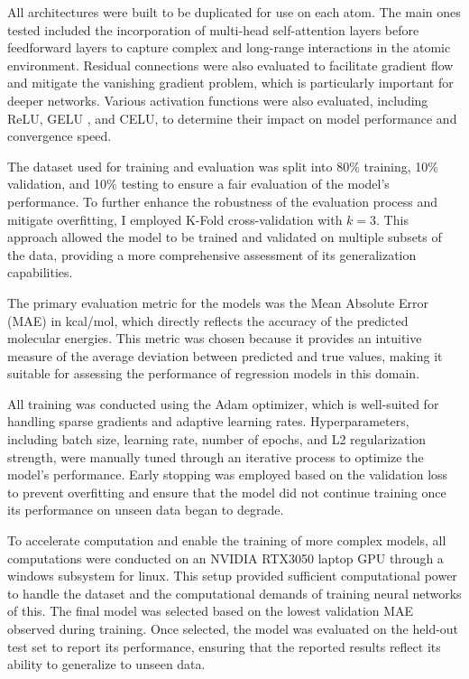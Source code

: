 All architectures were built to be duplicated for use on each atom. The main ones tested included the incorporation of multi-head self-attention layers \cite{vaswani2017attention} before feedforward layers to capture complex and long-range interactions in the atomic environment. Residual connections were also evaluated to facilitate gradient flow and mitigate the vanishing gradient problem, which is particularly important for deeper networks. Various activation functions were also evaluated, including ReLU, GELU \cite{hendrycks2016gaussian}, and CELU, to determine their impact on model performance and convergence speed.

The dataset used for training and evaluation was split into 80\% training, 10\% validation, and 10\% testing to ensure a fair evaluation of the model's performance. To further enhance the robustness of the evaluation process and mitigate overfitting, I employed K-Fold cross-validation with $k=3$. This approach allowed the model to be trained and validated on multiple subsets of the data, providing a more comprehensive assessment of its generalization capabilities.

 The primary evaluation metric for the models was the Mean Absolute Error (MAE) in kcal/mol, which directly reflects the accuracy of the predicted molecular energies. This metric was chosen because it provides an intuitive measure of the average deviation between predicted and true values, making it suitable for assessing the performance of regression models in this domain.

All training was conducted using the Adam optimizer, which is well-suited for handling sparse gradients and adaptive learning rates. Hyperparameters, including batch size, learning rate, number of epochs, and L2 regularization strength, were manually tuned through an iterative process to optimize the model's performance. Early stopping was employed based on the validation loss to prevent overfitting and ensure that the model did not continue training once its performance on unseen data began to degrade.

To accelerate computation and enable the training of more complex models, all computations were conducted on an NVIDIA RTX3050 laptop GPU through a windows subsystem for linux. This setup provided sufficient computational power to handle the dataset and the computational demands of training neural networks of this. The final model was selected based on the lowest validation MAE observed during training. Once selected, the model was evaluated on the held-out test set to report its performance, ensuring that the reported results reflect its ability to generalize to unseen data.


